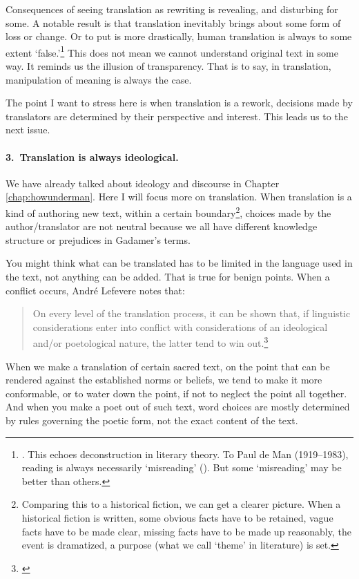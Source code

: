 Consequences of seeing translation as rewriting is revealing, and disturbing for some. A notable result is that translation inevitably brings about some form of loss or change. Or to put is more drastically, human translation is always to some extent `false.'\footnote{\citealp[p.~26]{fawcett:translation}. This echoes deconstruction in literary theory. To Paul de Man (1919--1983), reading is always necessarily `misreading' (\citealp[p.~172]{selden:literary}). But some `misreading' may be better than others.} This does not mean we cannot understand original text in some way. It reminds us the illusion of transparency. That is to say, in translation, manipulation of meaning is always the case.

The point I want to stress here is when translation is a rework, decisions made by translators are determined by their perspective and interest. This leads us to the next issue.

\paragraph*{3.\ Translation is always ideological.} We have already talked about ideology and discourse in Chapter \ref{chap:howunderman}. Here I will focus more on translation. When translation is a kind of authoring new text, within a certain boundary\footnote{Comparing this to a historical fiction, we can get a clearer picture. When a historical fiction is written, some obvious facts have to be retained, vague facts have to be made clear, missing facts have to be made up reasonably, the event is dramatized, a purpose (what we call `theme' in literature) is set.}, choices made by the author/translator are not neutral because we all have different knowledge structure or prejudices in Gadamer's terms.

You might think what can be translated has to be limited in the language used in the text, not anything can be added. That is true for benign points. When a conflict occurs, Andr\'e Lefevere notes that:

\begin{quote}
On every level of the translation process, it can be shown that, if linguistic considerations enter into conflict with considerations of an ideological and/or poetological nature, the latter tend to win out.\footnote{\citealp[p.~39]{lefevere:rewriting}}
\end{quote}

When we make a translation of certain sacred text, on the point that can be rendered against the established norms or beliefs, we tend to make it more conformable, or to water down the point, if not to neglect the point all together. And when you make a poet out of such text, word choices are mostly determined by rules governing the poetic form, not the exact content of the text.

